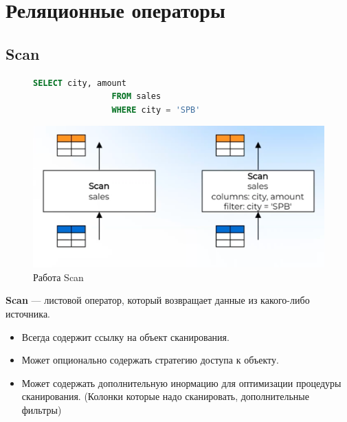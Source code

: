 \documentclass[11pt]{article}
\begin{document}
    \newpage


    \section{Реляционные операторы}

    \subsection{Scan}

    \begin{figure}[h!]
        \begin{minipage}{0.4\textwidth}
            \begin{lstlisting}[language=SQL, caption={SQL приводящий в Scan}]
                SELECT city, amount
                FROM sales
                WHERE city = 'SPB'
            \end{lstlisting}
        \end{minipage}
        \begin{minipage}{0.6\textwidth}
            \centering
            \includegraphics[width=\textwidth]{Pictures/Operators/Scan}
            \caption{Работа Scan}
        \end{minipage}
    \end{figure}

    \textbf{Scan} --- листовой оператор, который возвращает данные из какого-либо источника.

    \begin{itemize}
        \item Всегда содержит ссылку на объект сканирования.
        \item Может опционально содержать стратегию доступа к объекту.
        \item Может содержать дополнительную инормацию для оптимизации процедуры сканирования.
        (Колонки которые надо сканировать, дополнительные фильтры)
    \end{itemize}
\end{document}
